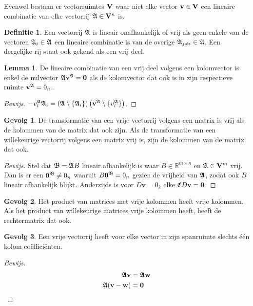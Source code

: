 \documentclass{amsart}
\theoremstyle{definition}
\newtheorem{lmm}{Lemma}[section]
\newtheorem{dfn}{Definitie}[section]
\newtheorem{csq}{Gevolg}[section]
\newenvironment{bewijs}{\begin{proof}[Bewijs]}{\end{proof}}
\newcommand{\setsm}[1]{\{{#1}\}}
\newcommand{\without}[1]{\setminus\setsm{#1}}
\newcommand{\realnums}{\mathbb{R}}
\newcommand{\realn}[1][n]{\realnums^{#1}}
\newcommand{\realmx}[2][n]{\realn[#2 \times #1]}
\newcommand{\realmxn}{\realmx{m}}
\newcommand{\vecspace}[1][v]{\mathrm{\mathbf{\MakeUppercase#1}}}
\newcommand{\vecspacen}[1][n]{\vecspace^#1}
\newcommand{\vvec}[1][v]{\mathbf{#1}}
\newcommand{\zerovec}{\vvec[0]}
\newcommand{\vecrow}[1][a]{\mathfrak{\MakeUppercase{#1}}}
\newcommand{\rvec}[2][i]{{#2}_{#1}}
\newcommand{\rvecr}[2][i]{\rvec[#1]{\vecrow[#2]}}
\newcommand{\rveci}[1][i]{\rvecr[#1]{a}}
\newcommand{\cvec}[2]{{#1}^{#2}}
\newcommand{\cvecv}[2][v]{\cvec{\vvec[#1]}{#2}}
\newcommand{\cvecc}[2][a]{\cvecv[#2]{\vecrow[#1]}}
\newcommand{\cvecvv}[1][v]{\cvecc{#1}}
\newcommand{\vcord}[3]{{#1}_{#2}^{#3}}
\newcommand{\vcordv}[3][v]{\vcord{#1}{#2}{\vecrow[#3]}}
\newcommand{\vcordvi}[2][i]{\vcordv{#1}{#2}}
\newcommand{\vcordvia}[1][i]{\vcordvi[#1]{a}}
\begin{document}
Evenwel bestaan er vectorruimtes $\vecspace$ waar niet elke vector $\vvec \in \vecspace$ een lineaire combinatie van elke vectorrij $\vecrow \in \vecspacen$ is.

\begin{dfn}
	Een vectorrij $\vecrow$ is lineair onafhankelijk of vrij als geen enkele van de vectoren $\vecrow_i \in \vecrow$ een lineaire combinatie is van de overige $\vecrow_{j\neq i} \in \vecrow$.
	Een dergelijke rij staat ook gekend als een vrij deel.
\end{dfn}

\begin{lmm}
	De lineaire combinatie van een vrij deel volgens een kolomvector is enkel de nulvector $\vecrow \cvecvv = \zerovec$ als de kolomvector dat ook is in zijn respectieve ruimte $\cvecvv = 0_n$.
	\begin{bewijs}
		$-\vcordvia \vecrow_i = \left(\vecrow \without{\rveci}\right)\left(\cvecvv \without{\vcordvia}\right)$.
	\end{bewijs}
\end{lmm}

\begin{csq}
	De transformatie van een vrije vectorrij volgens een matrix is vrij als de kolommen van de matrix dat ook zijn. Als de transformatie van een willekeurige vectorrij volgens een matrix vrij is, zijn de kolommen van de matrix dat ook.
	\begin{bewijs}
		Stel dat $\vecrow[b] = \vecrow B$ lineair afhankelijk is waar $B \in \realmxn$ en $\vecrow \in \vecspacen[m]$ vrij.
		Dan is er een $\cvecc[b]{0} \neq 0_n$ waaruit $B \cvecc[b]{0} = 0_n$ gezien de vrijheid van $\vecrow$, zodat ook $B$ lineair afhankelijk blijkt.
		Anderzijds is voor $D\vvec = 0_k$ elke $\vecrow[c] D\vvec = \zerovec$.
	\end{bewijs}
\end{csq}

\begin{csq}
	Het product van matrices met vrije kolommen heeft vrije kolommen. Als het product van willekeurige matrices vrije kolommen heeft, heeft de rechtermatrix dat ook.
\end{csq}

\begin{csq}
	Een vrije vectorrij heeft voor elke vector in zijn spanruimte slechts één kolom coëfficiënten.
	\begin{bewijs}
		\begin{align*}
			\vecrow \vvec              & = \vecrow \vvec[w] \\
			\vecrow (\vvec - \vvec[w]) & = \zerovec
		\end{align*}
	\end{bewijs}
\end{csq}
\end{document}
